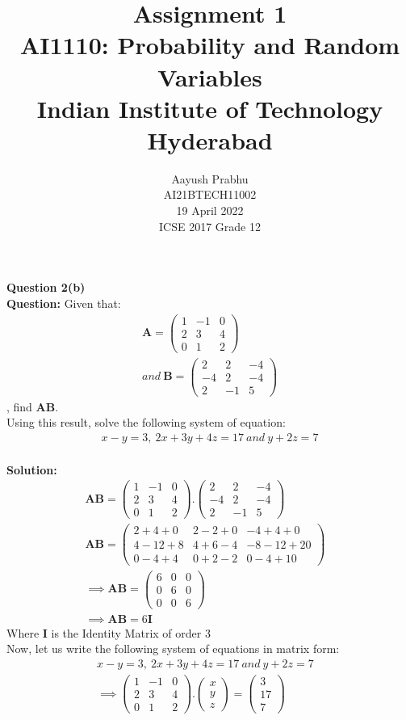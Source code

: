 \documentclass[journal,12pt,twocolumn]{IEEEtran}
\title{Assignment 1 \\ \Large AI1110: Probability and Random Variables \\ \large Indian Institute of Technology Hyderabad}
\author{Aayush Prabhu \\ \normalsize AI21BTECH11002 \\ \vspace*{20pt} \normalsize  19 April 2022 \\ \vspace*{20pt} \Large ICSE 2017 Grade 12}
\begin{document}
       \newcommand{\myvec}[1]{\ensuremath{\begin{pmatrix}#1\end{pmatrix}}}
       \let\vec\mathbf
       \maketitle
       \textbf{Question 2(b)}\\
       \textbf{Question:} Given that: \begin{align} \vec{A} = \myvec{1 & -1 & 0\\2 & 3 & 4\\0 & 1 & 2}\nonumber \\ and\:\vec{B} = \myvec{2 & 2 & -4\\-4 & 2 & -4\\2 & -1 &5} \nonumber 
       \end{align}, find $\vec{AB}$.\\
       Using this result, solve the following system of equation:
       \begin{align} x-y=3,\:2x+3y+4z=17\:and\:y+2z=7\nonumber 
       \end{align}\\
       \textbf{Solution:} 
       \begin{align}
          &\vec{AB} = \myvec{1 & -1 & 0\\2 & 3 & 4\\0 & 1 & 2}.\myvec{2 & 2 & -4\\-4 & 2 & -4\\2 & -1 &5}\nonumber&&\\
        &\vec{AB} = \myvec{2+4+0 & 2-2+0 & -4+4+0\\4-12+8 & 4+6-4 & -8-12+20\\0-4+4 & 0+2-2 & 0-4+10}\nonumber&&\\
        &\implies \vec{AB} = \myvec{6 & 0 & 0\\0 & 6 & 0\\0 & 0 & 6}&&\\
        &\implies \vec{AB} = 6\vec{I}&&
        \end{align} 
        Where $\vec{I}$ is the Identity Matrix of order 3\\
        Now, let us write the following system of equations in matrix form:
        \begin{align} 
        &x-y=3,\:2x+3y+4z=17\: and \:y+2z=7 &&\nonumber\\
        &\implies \myvec{1 & -1 & 0\\2 & 3 & 4\\0 & 1 & 2}.\myvec{x\\y\\z} = \myvec{3\\17\\7}&& \nonumber
        \end{align} 
\end{document}
